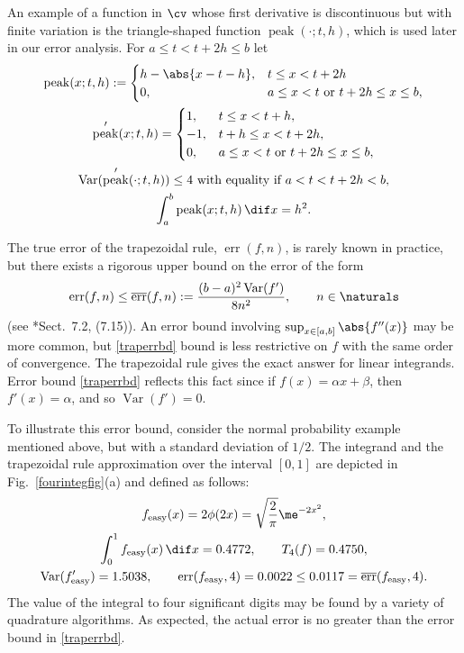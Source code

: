 \documentclass[]{article}
\DeclareMathOperator{\Var}{Var}
\DeclareMathOperator{\err}{err}
\newcommand{\oerr}{\overline{\err}}
\theoremstyle{definition}
\theoremstyle{remark}
\DeclareMathOperator{\tri}{peak}
\begin{document}
An example of a function in $\cv$ whose first derivative is  discontinuous but with finite variation is the triangle-shaped function  $\tri(\cdot;t,h)$, which is used later in our error analysis.  For $a \le t < t+2h \le b$ let 
\begin{subequations} \label{trifundef}
\begin{gather}
\tri(x;t,h):= \begin{cases} h -\abs{x-t-h},  & t \le x < t+2h  \\
0, & a \le x < t \text{ or } t+2h \le x \le b,
\end{cases} \\
\tri'(x;t,h) = \begin{cases} 
1, & t \le x < t+h, \\
-1, & t+h \le x < t+2h, \\
0, & a \le x < t \text{ or } t+2h \le x \le b, 
\end{cases} \\
\label{trifunVar}
\Var(\tri'(\cdot;t,h)) \le 4 \text{ with equality if $a < t  < t+2h < b$}, \\
\label{trifuninteg}
\int_a^b \tri(x;t,h) \, \dif x = h^2.
\end{gather}
\end{subequations}

The true error of the trapezoidal rule, $\err(f,n)$, is rarely known in practice, but there exists a rigorous upper bound on the error of the form 
\begin{equation} \label{traperrbd}
\err(f,n) \le \oerr(f,n):=\frac{(b-a)^2\Var(f')}{8n^2}, \qquad n \in \naturals
\end{equation}
(see *{Sect.\ 7.2, (7.15)}). An error bound involving $\sup_{x \in [a,b]} \abs{f''(x)}$ may be more common, but \eqref{traperrbd} bound is less restrictive on $f$ with the same order of convergence.  The trapezoidal rule gives the exact answer for linear integrands.  Error bound \eqref{traperrbd} reflects this fact since if $f(x)=\alpha x+ \beta$, then $f'(x)=\alpha$, and so $\Var(f')=0$.

To illustrate this error bound, consider the normal probability example mentioned above, but with a standard deviation of $1/2$.  The integrand and the trapezoidal rule approximation over the interval $[0,1]$ are depicted in Fig.\ \ref{fourintegfig}(a) and defined as follows:
\begin{subequations} \label{feasy}
\begin{gather}
f_{\text{easy}}(x) = 2\phi(2x) = \sqrt{\frac{2}{\pi}} \me^{-2x^2}, \\
\int_0^1 f_{\text{easy}}(x)  \, \dif x = 0.4772, \qquad T_{4}(f)= 0.4750, \\
\Var(f'_{\text{easy}}) = 1.5038, \qquad \err(f_{\text{easy}},4)=0.0022 \le 0.0117 = \oerr(f_{\text{easy}},4).
\end{gather}
\end{subequations}
The value of the integral to four significant digits may be found by a variety of quadrature algorithms. As expected, the actual error is no greater than the error bound in \eqref{traperrbd}.
\end{document}
